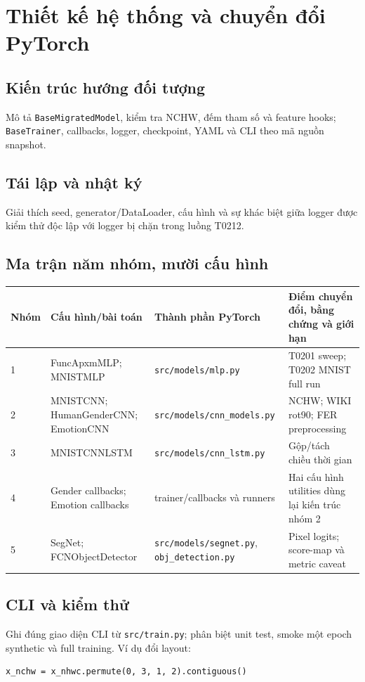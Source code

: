 \chapter{Thiết kế hệ thống và chuyển đổi PyTorch}
\section{Kiến trúc hướng đối tượng}
Mô tả \texttt{BaseMigratedModel}, kiểm tra NCHW, đếm tham số và feature hooks; \texttt{BaseTrainer}, callbacks, logger, checkpoint, YAML và CLI theo mã nguồn snapshot.

\section{Tái lập và nhật ký}
Giải thích seed, generator/DataLoader, cấu hình và sự khác biệt giữa logger được kiểm thử độc lập với logger bị chặn trong luồng T0212.

\section{Ma trận năm nhóm, mười cấu hình}
\begin{longtable}{p{}p{}p{}p{}}
\toprule Nhóm & Cấu hình/bài toán & Thành phần PyTorch & Điểm chuyển đổi, bằng chứng và giới hạn \\
\midrule
1 & FuncApxmMLP; MNISTMLP & \texttt{src/models/mlp.py} & T0201 sweep; T0202 MNIST full run \\
2 & MNISTCNN; HumanGenderCNN; EmotionCNN & \texttt{src/models/cnn\_models.py} & NCHW; WIKI rot90; FER preprocessing \\
3 & MNISTCNNLSTM & \texttt{src/models/cnn\_lstm.py} & Gộp/tách chiều thời gian \\
4 & Gender callbacks; Emotion callbacks & trainer/callbacks và runners & Hai cấu hình utilities dùng lại kiến trúc nhóm 2 \\
5 & SegNet; FCNObjectDetector & \texttt{src/models/segnet.py}, \texttt{obj\_detection.py} & Pixel logits; score-map và metric caveat \\
\bottomrule
\end{longtable}

\section{CLI và kiểm thử}
Ghi đúng giao diện CLI từ \texttt{src/train.py}; phân biệt unit test, smoke một epoch synthetic và full training. Ví dụ đổi layout:
\begin{lstlisting}[style=python,caption={Đổi layout NHWC sang NCHW}]
x_nchw = x_nhwc.permute(0, 3, 1, 2).contiguous()
\end{lstlisting}